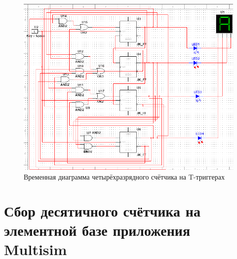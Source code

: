 \begin{figure}[ht]
    \centering
    \includegraphics[width=\linewidth]{img/sc4.png}
    \caption{Временная диаграмма четырёхразрядного счётчика на T-триггерах}
    \label{sc4}
\end{figure}

\pagebreak

\section{Сбор десятичного счётчика на элементной базе приложения Multisim}

